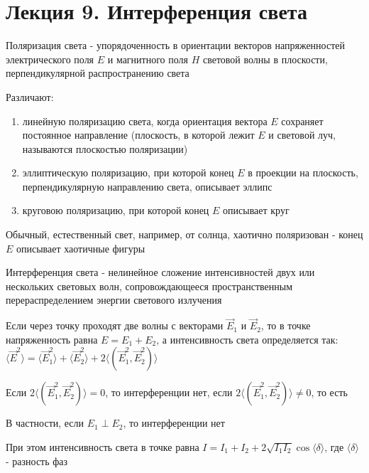 \documentclass[12pt]{article}
\begin{document}





\section{Лекция 9. Интерференция света}

Поляризация света - упорядоченность в ориентации векторов напряженностей электрического поля $E$
и магнитного поля $H$ световой волны в плоскости, перпендикулярной распространению света

Различают: 

\begin{enumerate}
    \item линейную поляризацию света, когда ориентация вектора $E$ сохраняет постоянное направление 
(плоскость, в которой лежит $E$ и световой луч, называются плоскостью поляризации)

    \item эллиптическую поляризацию, при которой конец $E$ в проекции на плоскость, 
    перпендикулярную направлению света, описывает эллипс 

    \item круговою поляризацию, при которой конец $E$ описывает круг
\end{enumerate}

Обычный, естественный свет, например, от солнца, хаотично поляризован - конец $E$ описывает хаотичные фигуры

Интерференция света - нелинейное сложение интенсивностей двух или нескольких световых волн, 
сопровождающееся пространственным перераспределением энергии светового излучения

Если через точку проходят две волны с векторами $\vec E_1$ и $\vec E_2$, то в точке напряженность равна $E = E_1 + E_2$, 
а интенсивность света определяется так: $\langle \vec E^2 \rangle = \langle \vec E_1^2 \rangle + \langle \vec E_2^2 \rangle + 2\langle (\vec E^2_1, \vec E_2^2) \rangle$

Если $2\langle (\vec E^2_1, \vec E_2^2) \rangle = 0$, то интерференции нет, если $2\langle (\vec E^2_1, \vec E_2^2) \rangle \neq 0$, то есть 

В частности, если $E_1 \perp E_2$, то интерференции нет 

При этом интенсивность света в точке равна $I = I_1 + I_2 + 2\sqrt{I_1 I_2} \cos \langle \delta \rangle$, где $\langle \delta \rangle$ - разность фаз
\end{document}
